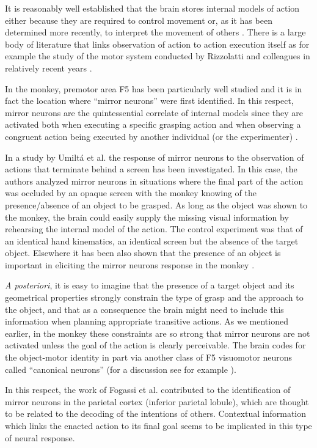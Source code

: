 It is reasonably well established that the brain stores internal models of action
either because they are required to control movement or, as it has been determined
more recently, to interpret the movement of others \cite{kawato-99}. There is a large body of 
literature that links observation of action to action execution itself as for 
example the study of the motor system conducted by Rizzolatti and colleagues in 
relatively recent years \cite{rizzolatti-04,gallese-96,rizzolatti-01}. 

In the monkey, premotor area F5 has been particularly well studied and it is in fact the 
location where ``mirror neurons'' were first identified. In this respect, mirror neurons 
are the quintessential correlate of internal models since they are activated 
both when executing a specific grasping action and when observing a congruent action 
being executed by another individual (or the experimenter) \cite{fadiga-00}.

In a study by Umilt\'a et al. \cite{umilta-01} the response of mirror neurons to the observation of
actions that terminate behind a screen has been investigated. In this case, the authors analyzed 
mirror neurons in situations where the final part of the action was occluded by an opaque 
screen with the monkey knowing of the presence/absence of an object to be grasped. As long
as the object was shown to the monkey, the brain could easily supply the missing
visual information by rehearsing the internal model of the action. The control experiment was that
of an identical hand kinematics, an identical screen but the absence of the target object.
Elsewhere it has been also shown that the presence of an object is important in eliciting the 
mirror neurons response in the monkey \cite{gallese-96}.

{\em A posteriori}, it is easy to imagine that the presence of a target object and its geometrical 
properties strongly constrain the type of grasp and the approach to the object, and that as a consequence 
the brain might need to include this information when planning appropriate transitive actions. 
As we mentioned earlier, in the monkey these constraints are so strong that mirror neurons are not 
activated unless the goal of the action is clearly perceivable. The brain codes for the object-motor 
identity in part via another class of F5 visuomotor neurons called ``canonical neurons'' (for a 
discussion see for example \cite{metta-06}). 

In this respect, the work of Fogassi et al. \cite{fogassi-05} contributed to the identification of mirror
neurons in the parietal cortex (inferior parietal lobule), which are thought to be related to the 
decoding of the intentions of others. Contextual information which links the enacted action to its
final goal seems to be implicated in this type of neural response.

